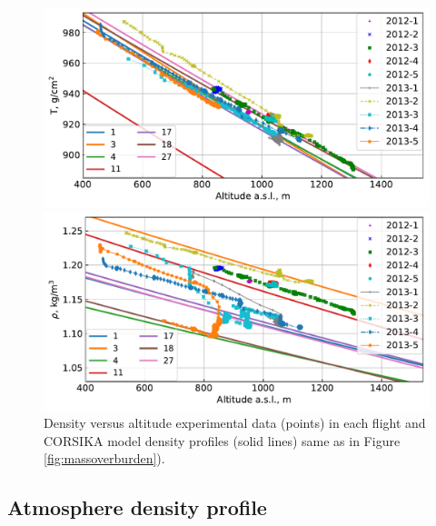 \documentclass[universe,article,submit,moreauthors,pdftex]{Definitions/mdpi}
\begin{document}
\begin{paracol}{2}
\begin{figure}[tbh]
    \begin{minipage}[t]{0.48\textwidth}
       \centering
       \includegraphics[width=\textwidth]{figs/atmosphere_T.pdf}
       \caption{Mass overburden versus altitude experimental data (points) in each flight and CORSIKA profiles (solid lines with corresponding model numbers). For preliminary SPHERE-2 modeling and analysis the N0 11 atmosphere was used.}
        \label{fig:massoverburden}
    \end{minipage}
    \hfill
    \begin{minipage}[t]{0.48\textwidth}
        \centering
        \includegraphics[width=\textwidth]{figs/atmosphere_rho.pdf}
        \caption{Density versus altitude experimental data (points) in each flight and CORSIKA model density profiles (solid lines) same as in Figure \ref{fig:massoverburden}).}
        \label{fig:density}
   \end{minipage}
\end{figure}


\subsection{Atmosphere density profile}
\label{sect:atmosphere-profile}


\end{paracol}
\end{document}
